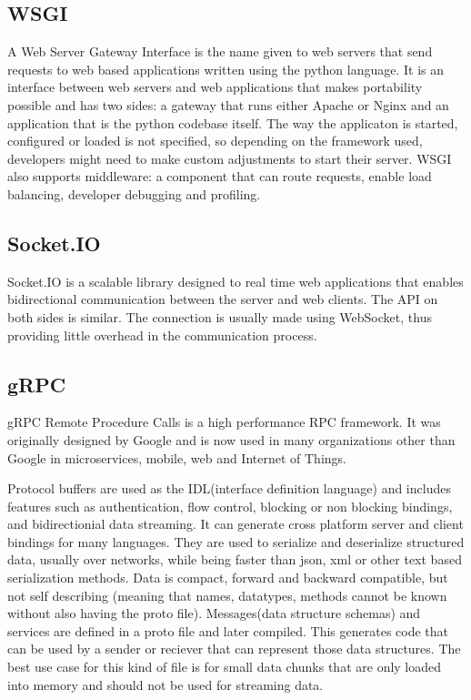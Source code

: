     \subsection{WSGI}
    A Web Server Gateway Interface is the name given to web servers that send requests to web based applications written using the python language. It is an interface between web servers and web applications that makes portability possible and has two sides: a gateway that runs either Apache or Nginx and an application that is the python codebase itself. The way the applicaton is started, configured or loaded is not specified, so depending on the framework used, developers might need to make custom adjustments to start their server.
    WSGI also supports middleware: a component that can route requests, enable load balancing, developer debugging and profiling.
    \subsection{Socket.IO}
    Socket.IO is a scalable library designed to real time web applications that enables bidirectional communication between the server and web clients. The API on both sides is similar. The connection is usually made using WebSocket, thus providing little overhead in the communication process.
    \subsection{gRPC}
    gRPC Remote Procedure Calls is a high performance RPC framework. It was originally designed by Google and is now used in many organizations other than Google in microservices, mobile, web and Internet of Things.

    Protocol buffers are used as the IDL(interface definition language) and includes features such as authentication, flow control, blocking or non blocking bindings, and bidirectionial data streaming. It can generate cross platform server and client bindings for many languages. They are used to serialize and deserialize structured data, usually over networks, while being faster than json, xml or other text based serialization methods. Data is compact, forward and backward compatible, but not self describing (meaning that names, datatypes, methods cannot be known without also having the proto file). Messages(data structure schemas) and services are defined in a proto file and later compiled. This generates code that can be used by a sender or reciever that can represent those data structures. The best use case for this kind of file is for small data chunks that are only loaded into memory and should not be used for streaming data.
    
